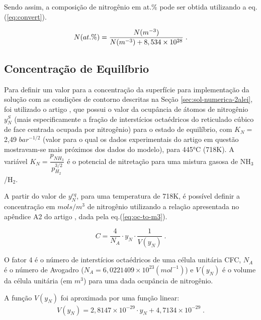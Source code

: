 \FloatBarrier

Sendo assim, a composição de nitrogênio em at.\% pode ser obtida utilizando a eq.(\ref{eq:convert}).

\begin{equation}
\label{eq:convert}
	N(at.\%) = \dfrac{N(m^{-3})}{N(m^{-3}) + 8,534 \times 10^{28}\\  } \;. 
\end{equation}

\FloatBarrier

\subsection{Concentração de Equilíbrio}
\label{sec:ceq-param}
Para definir um valor para a concentração da superfície para implementação da solução com as condições de contorno descritas na Seção \autoref{sec:sol-numerica-2alei}, foi utilizado o artigo  \cite{christiansen2008nitrogen}, que possui o valor da ocupância de átomos de nitrogênio $y_N^{S}$ (mais especificamente a fração de interstícios octaédricos do reticulado cúbico de face centrada ocupada por nitrogênio) para o estado de equilíbrio, com $K_N=$2,49 $bar^{-1/2}$ (valor para o qual os dados experimentais do artigo em questão mostravam-se mais próximos dos dados do modelo), para 445°C (718K). A variável $K_N=\dfrac{p_{NH_3}}{p_{H_2}^{3/2}}$ é o potencial de nitretação para uma mistura gasosa de NH$_3$/H$_2$.

A partir do valor de $y_N^{eq}$, para uma temperatura de 718K, é possível definir a concentração em $mols/m^3$ de nitrogênio utilizando a relação apresentada no apêndice A2 do artigo \cite{jespersen2016modelling}, dada pela eq.(\ref{eq:oc-to-m3}).

\begin{equation} \label{eq:oc-to-m3}
	C = \dfrac{4}{N_A} \cdot y_N \cdot \dfrac{1}{V(y_N)} \;.
\end{equation}

O fator 4 é o número de interstícios octaédricos de uma célula unitária CFC, $N_A$ é o número de Avogadro ($N_A = 6,0221409 \times 10^{23} (mol^{-1})$) e $V(y_N)$ é o volume da célula unitária (em $m^3$) para uma dada ocupância de nitrogênio.

A função $V(y_N)$ foi aproximada por uma função linear: 
\begin{gather*}
	V(y_N) = 2,8147 \times 10^{-29} \cdot y_N + 4,7134 \times 10^{-29}  \;.
\end{gather*}

